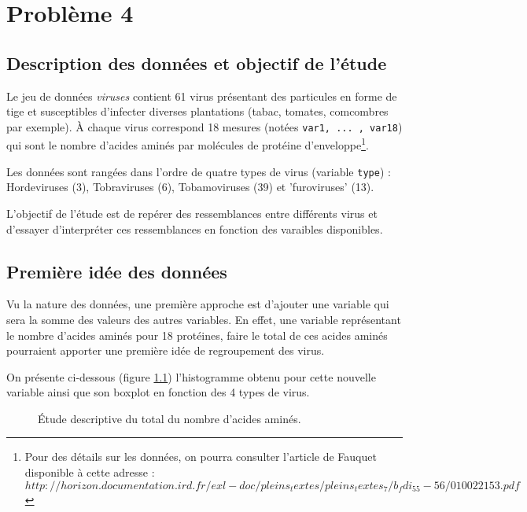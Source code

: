 \documentclass[a4paper]{report}
\begin{document}
  
   \chapter{Problème 4}
 
\section{Description des données et objectif de l'étude}
Le jeu de données \emph{viruses} contient 61 virus présentant des particules en forme de tige et susceptibles d'infecter diverses plantations (tabac, tomates, comcombres par exemple). À chaque virus correspond 18 mesures (notées \verb|var1, ... , var18|) qui sont le nombre d'acides aminés par molécules de protéine d'enveloppe\footnote{Pour des détails sur les données, on pourra consulter l'article de Fauquet disponible à cette adresse : $http://horizon.documentation.ird.fr/exl-doc/pleins_textes/pleins_textes_7/b_fdi_55-56/010022153.pdf$}. 

Les données sont rangées dans l'ordre de quatre types de virus (variable \verb|type|) : Hordeviruses (3), Tobraviruses (6), Tobamoviruses (39) et 'furoviruses' (13). 

L'objectif de l'étude est de repérer des ressemblances entre différents virus et d'essayer d'interpréter ces ressemblances en fonction des varaibles disponibles. 

\section{Première idée des données}
Vu la nature des données, une première approche est d'ajouter une variable qui sera la somme des valeurs des autres variables. En effet, une variable représentant le nombre d'acides aminés pour 18 protéines, faire le total de ces acides aminés pourraient apporter une première idée de regroupement des virus.

On présente ci-dessous (figure \ref{hist}) l'histogramme obtenu pour cette nouvelle variable ainsi que son boxplot en fonction des 4 types de virus.

 \begin{figure}[!ht]
	\centering
	\caption{Étude descriptive du total du nombre d'acides aminés. }
	\label{hist}

\end{figure}
\end{document}
